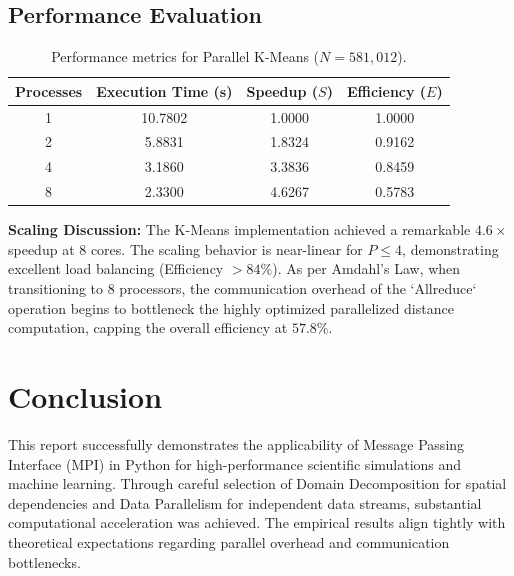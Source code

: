 \documentclass[12pt,a4paper]{article}
\begin{document}
\subsection{Performance Evaluation}

\begin{table}[H]
\centering
\begin{tabular}{@{}cccc@{}}
\toprule
\textbf{Processes} & \textbf{Execution Time (s)} & \textbf{Speedup ($S$)} & \textbf{Efficiency ($E$)} \\ \midrule
1                  & 10.7802                     & 1.0000                 & 1.0000                    \\
2                  & 5.8831                      & 1.8324                 & 0.9162                    \\
4                  & 3.1860                      & 3.3836                 & 0.8459                    \\
8                  & 2.3300                      & 4.6267                 & 0.5783                    \\ \bottomrule
\end{tabular}
\caption{Performance metrics for Parallel K-Means ($N=581,012$).}
\label{tab:kmeans_bench}
\end{table}

\textbf{Scaling Discussion:} The K-Means implementation achieved a remarkable $4.6\times$ speedup at 8 cores. The scaling behavior is near-linear for $P \le 4$, demonstrating excellent load balancing (Efficiency $> 84\%$). As per Amdahl's Law, when transitioning to 8 processors, the communication overhead of the `Allreduce` operation begins to bottleneck the highly optimized parallelized distance computation, capping the overall efficiency at $57.8\%$.

\section{Conclusion}
This report successfully demonstrates the applicability of Message Passing Interface (MPI) in Python for high-performance scientific simulations and machine learning. Through careful selection of Domain Decomposition for spatial dependencies and Data Parallelism for independent data streams, substantial computational acceleration was achieved. The empirical results align tightly with theoretical expectations regarding parallel overhead and communication bottlenecks.
\end{document}
